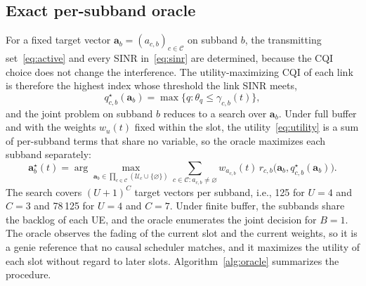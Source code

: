 \documentclass{ieeeaccess}
\begin{document}
\subsection{Exact per-subband oracle}
For a fixed target vector $\mathbf{a}_b = (a_{c,b})_{c \in \mathcal{C}}$ on subband $b$, the transmitting set~\eqref{eq:active} and every SINR in~\eqref{eq:sinr} are determined, because the CQI choice does not change the interference. The utility-maximizing CQI of each link is therefore the highest index whose threshold the link SINR meets,
\begin{equation}
q^{\star}_{c,b}(\mathbf{a}_b) = \max\{ q : \theta_q \le \gamma_{c,b}(t) \},
\label{eq:best_cqi}
\end{equation}
and the joint problem on subband $b$ reduces to a search over $\mathbf{a}_b$. Under full buffer and with the weights $w_u(t)$ fixed within the slot, the utility~\eqref{eq:utility} is a sum of per-subband terms that share no variable, so the oracle maximizes each subband separately:
\begin{equation}
\mathbf{a}^{\star}_b(t) = \arg\max_{\mathbf{a}_b \in \prod_{c \in \mathcal{C}} (\mathcal{U}_c \cup \{\varnothing\})} \sum_{c \in \mathcal{C} : a_{c,b} \ne \varnothing} w_{a_{c,b}}(t)\, r_{c,b}\bigl(\mathbf{a}_b, q^{\star}_{c,b}(\mathbf{a}_b)\bigr).
\label{eq:oracle}
\end{equation}
The search covers $(U+1)^C$ target vectors per subband, i.e., 125 for $U = 4$ and $C = 3$ and 78\,125 for $U = 4$ and $C = 7$. Under finite buffer, the subbands share the backlog of each UE, and the oracle enumerates the joint decision for $B = 1$. The oracle observes the fading of the current slot and the current weights, so it is a genie reference that no causal scheduler matches, and it maximizes the utility of each slot without regard to later slots. Algorithm~\ref{alg:oracle} summarizes the procedure.

\begin{algorithm}
\caption{Exact per-subband oracle}
\label{alg:oracle}
\;
\end{algorithm}
\end{document}
